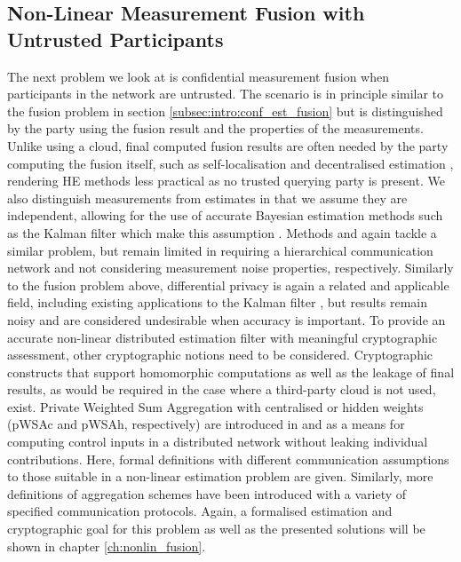 \subsection{Non-Linear Measurement Fusion with Untrusted Participants}\label{subsec:intro:conf_nonlin_measurements}
The next problem we look at is confidential measurement fusion when participants in the network are untrusted. The scenario is in principle similar to the fusion problem in section \ref{subsec:intro:conf_est_fusion} but is distinguished by the party using the fusion result and the properties of the measurements. Unlike using a cloud, final computed fusion results are often needed by the party computing the fusion itself, such as self-localisation and decentralised estimation \cite{sridharCooperativePerceptionAutonomous2019,grimeDataFusionDecentralized1994,pintoSelflocalisationIndoorMobile2013}, rendering HE methods less practical as no trusted querying party is present. We also distinguish measurements from estimates in that we assume they are independent, allowing for the use of accurate Bayesian estimation methods such as the Kalman filter which make this assumption \cite{haugBayesianEstimationTracking2012}. Methods \cite{aristovEncryptedMultisensorInformation2018} and \cite{alanwarPrOLocResilientLocalization2017} again tackle a similar problem, but remain limited in requiring a hierarchical communication network and not considering measurement noise properties, respectively. Similarly to the fusion problem above, differential privacy \cite{dworkDifferentialPrivacySurvey2008} is again a related and applicable field, including existing applications to the Kalman filter \cite{lenyDifferentiallyPrivateFiltering2014}, but results remain noisy and are considered undesirable when accuracy is important. To provide an accurate non-linear distributed estimation filter with meaningful cryptographic assessment, other cryptographic notions need to be considered. Cryptographic constructs that support homomorphic computations as well as the leakage of final results, as would be required in the case where a third-party cloud is not used, exist. Private Weighted Sum Aggregation with centralised or hidden weights (pWSAc and pWSAh, respectively) are introduced in \cite{schulzedarupEncryptedCooperativeControl2019} and \cite{alexandruPrivateWeightedSum2022} as a means for computing control inputs in a distributed network without leaking individual contributions. Here, formal definitions with different communication assumptions to those suitable in a non-linear estimation problem are given. Similarly, more definitions of aggregation schemes have been introduced \cite{shiPrivacyPreservingAggregationTimeSeries2011,joyeScalableSchemePrivacyPreserving2013,benhamoudaNewFrameworkPrivacyPreserving2016,darcoProbabilisticSecretSharing2018,beckerRevisitingPrivateStream2018,chanPrivacyPreservingStreamAggregation2012} with a variety of specified communication protocols. Again, a formalised estimation and cryptographic goal for this problem as well as the presented solutions will be shown in chapter \ref{ch:nonlin_fusion}.

